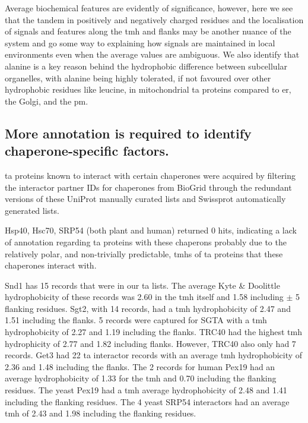 Average biochemical features are evidently of significance, however, here we see that the tandem in positively and negatively charged residues and the localisation of signals and features along the \gls{tmh} and flanks may be another nuance of the system and go some way to explaining how signals are maintained in local environments even when the average values are ambiguous.
We also identify that alanine is a key reason behind the hydrophobic difference between subcellular organelles, with alanine being highly tolerated, if not favoured over other hydrophobic residues like leucine, in mitochondrial \gls{ta} proteins compared to \gls{er}, the Golgi, and the \gls{pm}.

\subsection{More annotation is required to identify chaperone\--specific factors.}

\gls{ta} proteins known to interact with certain chaperones were acquired by filtering the interactor partner IDs for chaperones from BioGrid through the redundant versions of these UniProt manually curated lists and Swissprot automatically generated lists.

Hsp40, Hsc70, SRP54 (both plant and human) returned 0 hits, indicating a lack of annotation regarding \gls{ta} proteins with these chaperons probably due to the relatively polar, and non-trivially predictable, \gls{tmh}s of \gls{ta} proteins that these chaperones interact with.

Snd1 has 15 records that were in our \gls{ta} lists.
The average Kyte \& Doolittle hydrophobicity of these records was 2.60 in the \gls{tmh} itself and 1.58 including $\pm$ 5 flanking residues.
Sgt2, with 14 records, had a \gls{tmh} hydrophobicity of 2.47 and 1.51 including the flanks.
5 records were captured for SGTA with a \gls{tmh} hydrophobicity of 2.27 and 1.19 including the flanks.
TRC40 had the highest \gls{tmh} hydrophicity of 2.77 and 1.82 including flanks.
However, TRC40 also only had 7 records.
Get3 had 22 \gls{ta} interactor records with an average \gls{tmh} hydrophobicity of 2.36 and 1.48 including the flanks.
The 2 records for human Pex19 had an average hydrophobicity of 1.33 for the \gls{tmh} and 0.70 including the flanking residues.
The yeast Pex19 had a \gls{tmh} average hydrophobicity of 2.48 and 1.41 including the flanking residues.
The 4 yeast SRP54 interactors had an average \gls{tmh} of 2.43 and 1.98 including the flanking residues.

